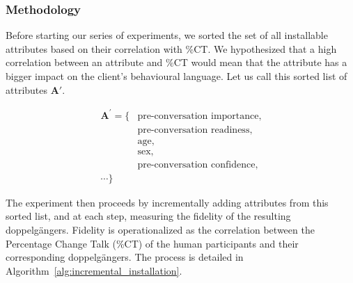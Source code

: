 \subsubsection{Methodology}
Before starting our series of experiments, we sorted the set of all installable attributes based on their correlation with \%CT. We hypothesized that a high correlation between an attribute and \%CT would mean that the attribute has a bigger impact on the client's behavioural language. Let us call this sorted list of attributes $\mathbf{A'}$. 

$$
\begin{aligned}
{\textbf{A}}^{'} = \{ & \text{pre-conversation importance,} \\
                     & \text{pre-conversation readiness,} \\
                     & \text{age,} \\
                     & \text{sex,} \\
                      & \text{pre-conversation confidence,} \\
                     \cdots \}
\end{aligned}
$$

The experiment then proceeds by incrementally adding attributes from this sorted list, and at each step, measuring the fidelity of the resulting doppelgängers. Fidelity is operationalized as the correlation between the Percentage Change Talk (\%CT) of the human participants and their corresponding doppelgängers. The process is detailed in Algorithm~\ref{alg:incremental_installation}.

